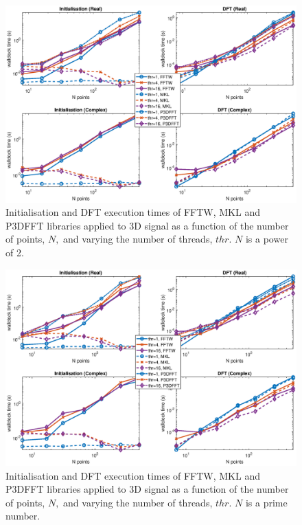 \documentclass[a4paper]{article}
\begin{document}
\begin{figure}[htb]
    \centering
    \includegraphics[width=\linewidth]{../results/fftw_mkl_p3dfft_2_3d_thr.eps}
  \caption{Initialisation and DFT execution times of FFTW, MKL and P3DFFT libraries applied to 3D signal as a function of the
    number of points, $N,$ and varying the number of threads, $thr.$ $N$ is a power of 2.}
  \label{3DFFTWMKL2}
\end{figure}


\begin{figure}[htb]
    \centering
    \includegraphics[width=\linewidth]{../results/fftw_mkl_p3dfft_prime_3d_thr.eps}
  \caption{Initialisation and DFT execution times of FFTW, MKL and P3DFFT libraries applied to 3D signal as a function of the
    number of points, $N,$ and varying the number of threads, $thr.$ $N$ is a prime number.}
  \label{3DFFTWMKLPrime}
\end{figure}
\end{document}
